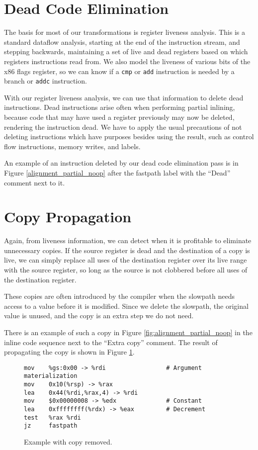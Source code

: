 \section{Dead Code Elimination}

The basis for most of our transformations is register liveness analysis.  This
is a standard dataflow analysis, starting at the end of the instruction stream,
and stepping backwards, maintaining a set of live and dead registers based on
which registers instructions read from.  We also model the liveness of various
bits of the x86 flags register, so we can know if a {\tt cmp} or {\tt add}
instruction is needed by a branch or {\tt addc} instruction.

With our register liveness analysis, we can use that information to delete dead
instructions.  Dead instructions arise often when performing partial inlining,
because code that may have used a register previously may now be deleted,
rendering the instruction dead.  We have to apply the usual precautions of not
deleting instructions which have purposes besides using the result, such as
control flow instructions, memory writes, and labels.

An example of an instruction deleted by our dead code elimination pass is in
Figure \ref{alignment_partial_noop} after the fastpath label with the ``Dead''
comment next to it.

\section{Copy Propagation}

Again, from liveness information, we can detect when it is profitable to
eliminate unnecessary copies.  If the source register is dead and the
destination of a copy is live, we can simply replace all uses of the destination
register over its live range with the source register, so long as the source is
not clobbered before all uses of the destination register.

These copies are often introduced by the compiler when the slowpath needs access
to a value before it is modified.  Since we delete the slowpath, the original
value is unused, and the copy is an extra step we do not need.

There is an example of such a copy in Figure \ref{fig:alignment_partial_noop} in
the inline code sequence next to the ``Extra copy'' comment.  The result of
propagating the copy is shown in Figure \ref{fig:copy_propagation}.

\begin{figure}
\begin{verbatim}
mov    %gs:0x00 -> %rdi                 # Argument materialization
mov    0x10(%rsp) -> %rax
lea    0x44(%rdi,%rax,4) -> %rdi
mov    $0x00000008 -> %edx              # Constant
lea    0xffffffff(%rdx) -> %eax         # Decrement
test   %rax %rdi
jz     fastpath
\end{verbatim}
\caption{Example with copy removed.}
\label{fig:copy_propagation}
\end{figure}

